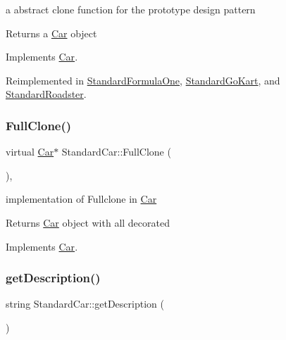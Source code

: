 a abstract clone function for the prototype design pattern \begin{DoxyReturn}{Returns}
a \mbox{\hyperlink{class_car}{Car}} object 
\end{DoxyReturn}


Implements \mbox{\hyperlink{class_car_a27ad98735fd4a3f675234ea806c227da}{Car}}.



Reimplemented in \mbox{\hyperlink{class_standard_formula_one_acd27c9ec96a7410d40c72666d36b6a7e}{Standard\+Formula\+One}}, \mbox{\hyperlink{class_standard_go_kart_aec5a6e2e21ab80b0ee072bbcdcf0323a}{Standard\+Go\+Kart}}, and \mbox{\hyperlink{class_standard_roadster_aa4aa69bc59c2095faae2fbc7de12798d}{Standard\+Roadster}}.

\mbox{\label{class_standard_car_a4fda894219093e86a4c9b1eeb0edc523}} 
\subsubsection{\texorpdfstring{Full\+Clone()}{FullClone()}}
{\footnotesize\ttfamily virtual \mbox{\hyperlink{class_car}{Car}}$\ast$ Standard\+Car\+::\+Full\+Clone (\begin{DoxyParamCaption}{ }\end{DoxyParamCaption})\hspace{0.3cm}{\ttfamily [inline]}, {\ttfamily [virtual]}}

implementation of Fullclone in \mbox{\hyperlink{class_car}{Car}} \begin{DoxyReturn}{Returns}
\mbox{\hyperlink{class_car}{Car}} object with all decorated 
\end{DoxyReturn}


Implements \mbox{\hyperlink{class_car_a6e32b3e8ddaaf2b3873c849e42f6a085}{Car}}.

\mbox{\label{class_standard_car_a54076de04cd09cdc102947f088eb8132}} 
\subsubsection{\texorpdfstring{get\+Description()}{getDescription()}}
{\footnotesize\ttfamily string Standard\+Car\+::get\+Description (\begin{DoxyParamCaption}{ }\end{DoxyParamCaption})\hspace{0.3cm}{\ttfamily [virtual]}}

